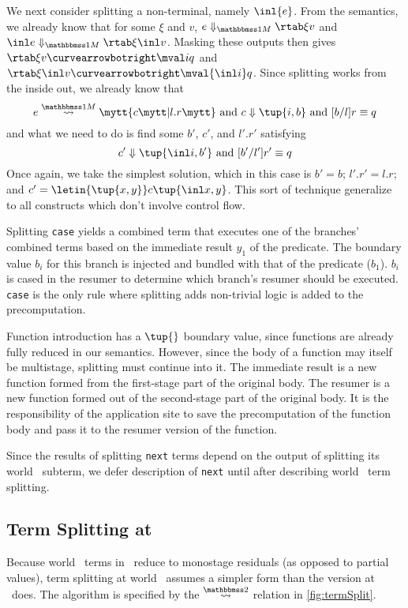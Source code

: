 \begin{abstrsyn}
We next consider splitting a non-terminal, namely $\inl {e}$.
From the semantics, we already know that 
for some $\xi$ and $v$, $\diaone {e} \xi v$ and $\diaone {\inl e} \xi {\inl v}$.
Masking these outputs then gives $\rtab \xi v \vsplito \mval i q$ 
and $\rtab \xi {\inl v} \vsplito \mval {\inl i} q$.
Since splitting works from the inside out, we already know that
\[
	\splitone e A c {l.r} \text{ and } \reduce c {\tup{i,b}} \text{ and } [b/l]r \equiv q
\]
and what we need to do is find some $b'$, $c'$, and $l'.r'$ satisfying
\[
	\reduce {c'} {\tup{\inl i,b'}} \text{ and } [b'/l']r' \equiv q
\]
Once again, we take the simplest solution, which in this case is $b' = b$; $l'.r' = l.r$;
and $c' = \letin {\tup {x,y}} c {\tup{\inl x, y}}$.  
This sort of technique generalize to all constructs which don't involve control flow.


Splitting {\tt case} yields a combined term that executes one of the branches' combined terms based on the immediate result $y_1$ of the predicate.
The boundary value $b_i$ for this branch is injected and bundled with that of the predicate ($b_1$).   
$b_i$ is cased in the resumer to determine which branch's resumer should be executed.
{\tt case} is the only rule where splitting adds non-trivial logic is added to the precomputation.

Function introduction has a $\tup{}$ boundary value,
since functions are already fully reduced in our semantics.
However, since the body of a function may itself be multistage, splitting must continue into it.
The immediate result is a new function formed from the first-stage part of the original body.
The resumer is a new function formed out of the second-stage part of the original body.
It is the responsibility of the application site to save the precomputation of the function body
and pass it to the resumer version of the function.

Since the results of splitting \texttt{next} terms depend on the output of
splitting its world \bbtwo\ subterm,
we defer description of \texttt{next} until after describing world \bbtwo\ term splitting.

\subsection{Term Splitting at \bbtwo}

Because world \bbtwo\ terms in \lang\ reduce to monostage residuals (as opposed to partial values),
term splitting at world \bbtwo\ assumes a simpler form than the version at \bbonem\ does. 
The algorithm is specified by the $\splittwosym$ relation in \cref{fig:termSplit}.


\end{abstrsyn}
